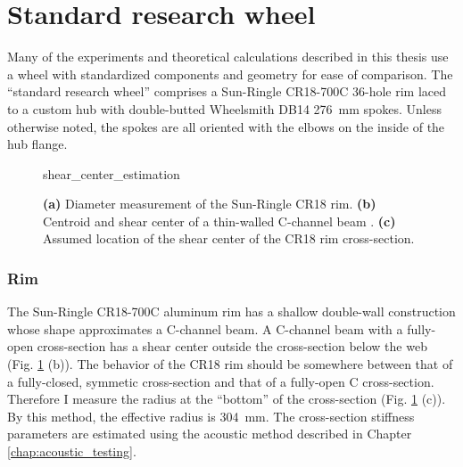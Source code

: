 \documentclass[../../thesis.tex]{subfiles}
\begin{document}
\section{Standard research wheel}
\label{app:std_research_wheel}

Many of the experiments and theoretical calculations described in this thesis use a wheel with standardized components and geometry for ease of comparison. The ``standard research wheel'' comprises a Sun-Ringle CR18-700C 36-hole rim laced to a custom hub with double-butted Wheelsmith DB14 \SI{276}{mm} spokes. Unless otherwise noted, the spokes are all oriented with the elbows on the inside of the hub flange.

\begin{figure}[h]
\centering
{shear_center_estimation}
\caption{\textbf{(a)} Diameter measurement of the Sun-Ringle CR18 rim. \textbf{(b)} Centroid and shear center of a thin-walled C-channel beam \cite{Timoshenko1961}. \textbf{(c)} Assumed location of the shear center of the CR18 rim cross-section.}
\label{fig:shear_center_estimation}
\end{figure}

\subsubsection*{Rim}

The Sun-Ringle CR18-700C aluminum rim has a shallow double-wall construction whose shape approximates a C-channel beam. A C-channel beam with a fully-open cross-section has a shear center outside the cross-section below the web \cite{Timoshenko1961} (Fig. \ref{fig:shear_center_estimation} (b)). The behavior of the CR18 rim should be somewhere between that of a fully-closed, symmetic cross-section and that of a fully-open C cross-section. Therefore I measure the radius at the ``bottom'' of the cross-section (Fig. \ref{fig:shear_center_estimation} (c)). By this method, the effective radius is \SI{304}{mm}. The cross-section stiffness parameters are estimated using the acoustic method described in Chapter \ref{chap:acoustic_testing}.
\end{document}
